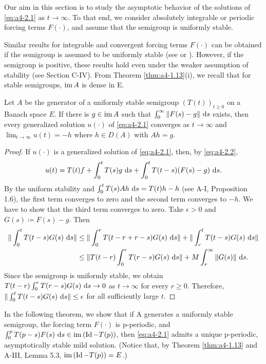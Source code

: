 
Our aim in this section is to study the asymptotic behavior of the solutions of \eqref{eq:a4-2.1} as $t \to \infty$. 
To that end, we consider absolutely integrable or periodic forcing terms $F(\cdot)$, and assume that the semigroup
is uniformly stable.


Similar results for integrable and convergent forcing terms $F(\cdot)$ can
be obtained if the semigroup is assumed to be uniformly  
stable (see \citet[p.119]{pazy:1983} or \citet{neubrander:1985b}). 
However, if the
semigroup is positive, these results hold even under the weaker assumption of stability (see Section C-IV).
From Theorem \ref{thm:a4-1.13}(i), we recall that for stable
semigroups, $\mathop{}\!\mathrm{im}\, A$ is dense in E.

\begin{theorem}\label{thm:a4-2.1}
Let $A$ be the generator of a uniformly stable semigroup
$(T(t))_{t \geq 0}$ on a Banach space $E$. 
If there is $g \in \mathop{}\!\mathrm{im}\, A$ such that
$\int_{0}^{\infty} \|F(s) - g\| \,\mathop{}\!\mathrm{d}{s}$ exists, then every generalized solution $u(\cdot)$ of
\eqref{eq:a4-2.1} converges as $t \to \infty$ and $\lim_{t \to \infty} u(t) = -h$ where $h \in D(A)$ with
$Ah = g$.
\end{theorem}

\begin{proof}
If $u(\cdot)$ is a generalized solution of \eqref{eq:a4-2.1}, then, by \eqref{eq:a4-2.2},
\[
u(t) = T(t)f + \int_{0}^{t} T(s)g \,\mathop{}\!\mathrm{d}{s} + \int_{0}^{t} T(t-s)(F(s)-g) \,\mathop{}\!\mathrm{d}{s}.
\]
By the uniform
stability and $\int_0^t T(s)Ah\,\mathop{}\!\mathrm{d}{s} = T(t)h - h$ (see A-I, Proposition 1.6), the first term converges to zero
and the second term converges to $-h$. 
We have to show that the
third term converges to zero. 
Take $\epsilon > 0$ and $G(s) \coloneqq F(s)-g$. 
Then
\begin{align*}
\|\int_{0}^{t} T(t-s)G(s) \,\mathop{}\!\mathrm{d}{s}\| &\leq \|\int_{0}^{r} T(t-r+r-s)G(s) \,\mathop{}\!\mathrm{d}{s}\| + \|\int_{r}^{t} T(t-s)G(s) \,\mathop{}\!\mathrm{d}{s}\|\\
&\leq \|T(t-r)\int_{0}^{r} T(r-s)G(s) \,\mathop{}\!\mathrm{d}{s}\| + M \int_{r}^{\infty} \|G(s)\| \,\mathop{}\!\mathrm{d}{s}.
\end{align*}
Since the semigroup is uniformly stable, we obtain
$T(t-r)\int_{0}^{r} T(r-s)G(s) \,\mathop{}\!\mathrm{d}{s} \to 0$ as $t \to \infty$ for every $r \geq 0$.
Therefore, $\|\int_{0}^{t} T(t-s)G(s) \,\mathop{}\!\mathrm{d}{s}\| \leq \epsilon$ for all sufficiently large $t$.
\end{proof}

In the following theorem, we show that if A generates a
uniformly stable semigroup, the forcing term $F(\cdot)$ is p-periodic,
and $\int_{0}^{p} T(p-s)F(s) \,\mathop{}\!\mathrm{d}{s} \in \mathop{}\!\mathrm{im}\,(\operatorname{Id} - T(p))$, then \eqref{eq:a4-2.1}
admits a unique p-periodic, asymptotically stable mild solution. (Notice that, by
Theorem \ref{thm:a4-1.13} and A-III, Lemma 5.3, $\mathop{}\!\mathrm{im}\,(\operatorname{Id} - T(p)) = E$.)

